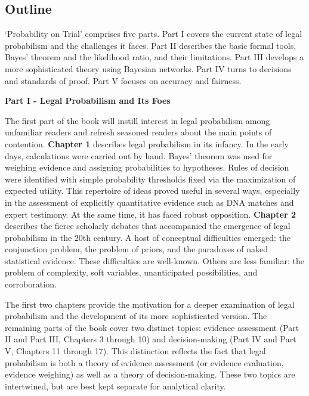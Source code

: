 \documentclass[
  10pt,
  dvipsnames,enabledeprecatedfontcommands]{scrartcl}
\begin{document}
\hypertarget{outline}{%
\subsection{Outline}\label{outline}}

`Probability on Trial' comprises five parts. Part I covers the current
state of legal probabilism and the challenges it faces. Part II
describes the basic formal tools, Bayes' theorem and the likelihood
ratio, and their limitations. Part III develops a more sophisticated
theory using Bayesian networks. Part IV turns to decisions and standards
of proof. Part V focuses on accuracy and fairness.

\vspace{2mm}

\noindent \textbf{Part I - Legal Probabilism and Its Foes}

\noindent The first part of the book will instill interest in legal
probabilism among unfamiliar readers and refresh seasoned readers about
the main points of contention. \textbf{Chapter 1} describes legal
probabilism in its infancy. In the early days, calculations were carried
out by hand. Bayes' theorem was used for weighing evidence and assigning
probabilities to hypotheses. Rules of decision were identified with
simple probability thresholds fixed via the maximization of expected
utility. This repertoire of ideas proved useful in several ways,
especially in the assessment of explicitly quantitative evidence such as
DNA matches and expert testimony. At the same time, it has faced robust
opposition. \textbf{Chapter 2} describes the fierce scholarly debates
that accompanied the emergence of legal probabilism in the 20th century.
A host of conceptual difficulties emerged: the conjunction problem, the
problem of priors, and the paradoxes of naked statistical evidence.
These difficulties are well-known. Others are less familiar: the problem
of complexity, soft variables, unanticipated possibilities, and
corroboration.

The first two chapters provide the motivation for a deeper examination
of legal probabilism and the development of its more sophisticated
version. The remaining parts of the book cover two distinct topics:
evidence assessment (Part II and Part III, Chapters 3 through 10) and
decision-making (Part IV and Part V, Chapters 11 through 17). This
distinction reflects the fact that legal probabilism is both a theory of
evidence assessment (or evidence evaluation, evidence weighing) as well
as a theory of decision-making. These two topics are intertwined, but
are best kept separate for analytical clarity.
\end{document}
